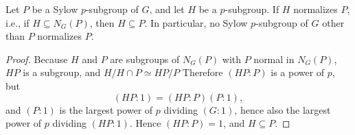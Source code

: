\begin{lemma}
  Let \( P \) be a Sylow \( p \)-subgroup of \( G \), and let \( H \) be a \( p \)-subgroup.
  If \( H \) normalizes \( P \), i.e., if \( H \subseteq N_G(P) \), then \( H \subseteq P \).
  In particular, no Sylow \( p \)-subgroup of \( G \) other than \( P \) normalizes \( P \).
\end{lemma}
\begin{proof}
  Because \( H \) and \( P \) are subgroups of \( N_G(P) \) with \( P \) normal in \( N_G(P) \), \( HP \) is a subgroup, and \( H / H \cap P \simeq HP / P \)
  Therefore \( (HP : P) \) is a power of \( p \), but
  \[
    (HP : 1) = (HP : P)(P : 1),
  \]
  and \( (P : 1) \) is the largest power of \( p \) dividing \( (G : 1) \), hence also the largest power of \( p \) dividing \( (HP : 1) \).
  Hence \( (HP : P) = 1 \), and \( H \subseteq P \).
\end{proof}

